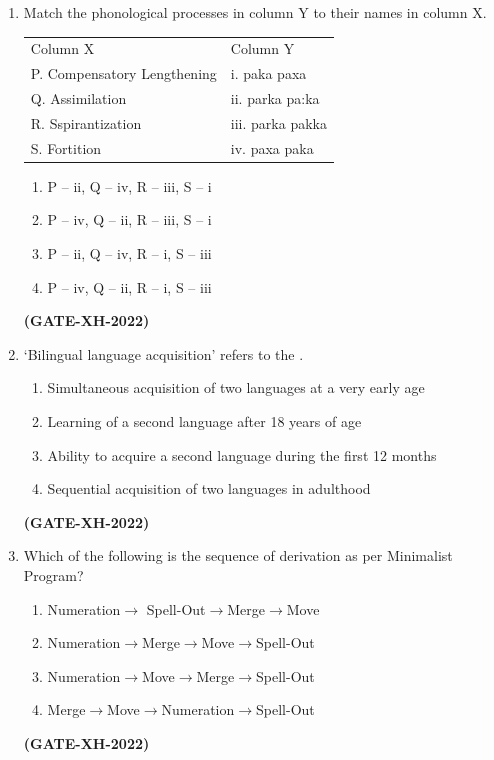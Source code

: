 \documentclass[journal]{IEEEtran}
\begin{document}
\begin{enumerate}
\item Match the phonological processes in column Y to their names in column X.
\begin{tabular}{|p{5cm}|p{3cm}|}
\hline
  Column X   & Column Y \\
    P. Compensatory Lengthening & i. paka paxa\\
    Q. Assimilation & ii. parka pa:ka\\
    R. Sspirantization & iii. parka pakka\\
    S. Fortition & iv. paxa paka\\
\hline
\end{tabular}
\vspace{0.2cm}
\begin{enumerate}
\item P – ii, Q – iv, R – iii, S – i
\item P – iv, Q – ii, R – iii, S – i
\item P – ii, Q – iv, R – i, S – iii
\item P – iv, Q – ii, R – i, S – iii
\end{enumerate}
\hfill\textbf{(GATE-XH-2022)}

\item ‘Bilingual language acquisition’ refers to the \underline{\hspace{2cm}}.
\begin{enumerate}
\item Simultaneous acquisition of two languages at a very early age
\item Learning of a second language after 18 years of age
\item Ability to acquire a second language during the first 12 months
\item Sequential acquisition of two languages in adulthood
\end{enumerate}
\hfill\textbf{(GATE-XH-2022)}

\item Which of the following is the sequence of derivation as per Minimalist Program?
\begin{enumerate}
\item Numeration$\rightarrow$ Spell-Out$\rightarrow$Merge$\rightarrow$Move
\item Numeration$\rightarrow$Merge$\rightarrow$Move$\rightarrow$Spell-Out
\item Numeration$\rightarrow$Move$\rightarrow$Merge$\rightarrow$Spell-Out
\item Merge$\rightarrow$Move$\rightarrow$Numeration$\rightarrow$Spell-Out
\end{enumerate}
\hfill\textbf{(GATE-XH-2022)}


\end{enumerate}
\end{document}
